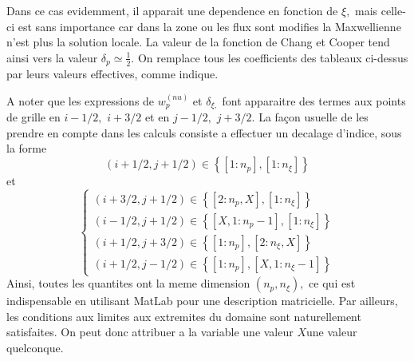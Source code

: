 Dans ce cas evidemment, il apparait une dependence en fonction de $\xi,$
mais celle-ci est sans importance car dans la zone ou les flux sont modifies
la Maxwellienne n'est plus la solution locale. La valeur de la fonction de
Chang et Cooper tend ainsi vers la valeur $\delta_{p}\simeq\frac{1}{2}.$ On
remplace tous les coefficients des tableaux ci-dessus par leurs valeurs
effectives, comme indique.

A noter que les expressions de $w_{p}^{(nu)}$ et $\delta_{\xi,}$ font
apparaitre des termes aux points de grille en $i-1/2,$ $i+3/2$ et en $j-1/2,$
$j+3/2.$ La fa\c{c}on usuelle de les prendre en compte dans les calculs
consiste a effectuer un decalage d'indice, sous la forme 
\[
\left(i+1/2,j+1/2\right)\in\left\{
\left[1:n_{p}\right],\left[1:n_{\xi}\right]\right\} 
\]
et 
\[
\left\{ 
\begin{array}{l}
\left(i+3/2,j+1/2\right)\in\left\{
\left[2:n_{p},X\right],\left[1:n_{\xi}\right]\right\} \\ 
\left(i-1/2,j+1/2\right)\in\left\{
\left[X,1:n_{p}-1\right],\left[1:n_{\xi}\right]\right\} \\ 
\left(i+1/2,j+3/2\right)\in\left\{
\left[1:n_{p}\right],\left[2:n_{\xi},X\right]\right\} \\ 
\left(i+1/2,j-1/2\right)\in\left\{
\left[1:n_{p}\right],\left[X,1:n_{\xi}-1\right]\right\}
\end{array}
\right.
\]
Ainsi, toutes les quantites ont la meme dimension $\left(n_{p},n_{\xi}%
\right),$ ce qui est indispensable en utilisant MatLab pour une description
matricielle. Par ailleurs, les conditions aux limites aux extremites du
domaine sont naturellement satisfaites. On peut donc attribuer a la variable
une valeur $X$une valeur quelconque.
